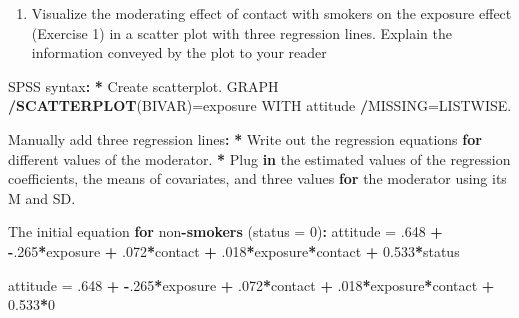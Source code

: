 \documentclass[a4paper]{book}
\newenvironment{Shaded}{\begin{snugshade}}{\end{snugshade}}
\newcommand{\KeywordTok}[1]{\textcolor[rgb]{0,0,0}{\textbf{#1}}}
\newcommand{\DataTypeTok}[1]{\textcolor[rgb]{0,0,0}{#1}}
\newcommand{\DecValTok}[1]{\textcolor[rgb]{0.00,0.00,0.00}{#1}}
\newcommand{\FloatTok}[1]{\textcolor[rgb]{0.00,0.00,0.00}{#1}}
\newcommand{\StringTok}[1]{\textcolor[rgb]{0.00,0.00,0.00}{#1}}
\newcommand{\ControlFlowTok}[1]{\textcolor[rgb]{0.00,0.00,0.00}{\textbf{#1}}}
\newcommand{\OperatorTok}[1]{\textcolor[rgb]{0.00,0.00,0.00}{\textbf{#1}}}
\newcommand{\ErrorTok}[1]{\textcolor[rgb]{0.00,0.00,0.00}{\textbf{#1}}}
\newcommand{\NormalTok}[1]{#1}
\providecommand{\tightlist}{%
  \setlength{\itemsep}{0pt}\setlength{\parskip}{0pt}}
\theoremstyle{definition}
\theoremstyle{definition}
\theoremstyle{definition}
\theoremstyle{remark}
\begin{document}
\begin{enumerate}
\def\labelenumi{\arabic{enumi}.}
\setcounter{enumi}{1}
\tightlist
\item
  Visualize the moderating effect of contact with smokers on the
  exposure effect (Exercise 1) in a scatter plot with three regression
  lines. Explain the information conveyed by the plot to your reader
\end{enumerate}

\begin{Shaded}
\begin{Highlighting}[]
\NormalTok{SPSS syntax}\OperatorTok{:}\StringTok{  }
\StringTok{  }
\ErrorTok{*}\StringTok{ }\NormalTok{Create scatterplot.  }
\NormalTok{GRAPH  }
  \OperatorTok{/}\KeywordTok{SCATTERPLOT}\NormalTok{(BIVAR)=exposure WITH attitude  }
  \OperatorTok{/}\NormalTok{MISSING=LISTWISE.  }
  
\NormalTok{Manually add three regression lines}\OperatorTok{:}\StringTok{  }
\StringTok{  }
\ErrorTok{*}\StringTok{ }\NormalTok{Write out the regression equations }\ControlFlowTok{for}\NormalTok{ different values of the moderator.}
\OperatorTok{*}\StringTok{ }\NormalTok{Plug }\ControlFlowTok{in}\NormalTok{ the estimated values of the regression coefficients, the means of}
\NormalTok{covariates, and three values }\ControlFlowTok{for}\NormalTok{ the moderator using its M and SD.}
  
\NormalTok{The initial equation }\ControlFlowTok{for}\NormalTok{ non}\OperatorTok{-}\KeywordTok{smokers}\NormalTok{ (}\DataTypeTok{status =} \DecValTok{0}\NormalTok{)}\OperatorTok{:}\StringTok{  }
\StringTok{  }
\NormalTok{attitude =}\StringTok{ }\NormalTok{.}\DecValTok{648} \OperatorTok{+}\StringTok{ }\OperatorTok{-}\NormalTok{.}\DecValTok{265}\OperatorTok{*}\NormalTok{exposure }\OperatorTok{+}\StringTok{ }\NormalTok{.}\DecValTok{072}\OperatorTok{*}\NormalTok{contact }\OperatorTok{+}\StringTok{ }
\StringTok{  }\NormalTok{.}\DecValTok{018}\OperatorTok{*}\NormalTok{exposure}\OperatorTok{*}\NormalTok{contact }\OperatorTok{+}\StringTok{ }\FloatTok{0.533}\OperatorTok{*}\NormalTok{status  }
  
\NormalTok{attitude =}\StringTok{ }\NormalTok{.}\DecValTok{648} \OperatorTok{+}\StringTok{ }\OperatorTok{-}\NormalTok{.}\DecValTok{265}\OperatorTok{*}\NormalTok{exposure }\OperatorTok{+}\StringTok{ }\NormalTok{.}\DecValTok{072}\OperatorTok{*}\NormalTok{contact }\OperatorTok{+}\StringTok{ }
\StringTok{  }\NormalTok{.}\DecValTok{018}\OperatorTok{*}\NormalTok{exposure}\OperatorTok{*}\NormalTok{contact }\OperatorTok{+}\StringTok{ }\FloatTok{0.533}\OperatorTok{*}\DecValTok{0}  
  

\end{Highlighting}
\end{Shaded}
\end{document}
